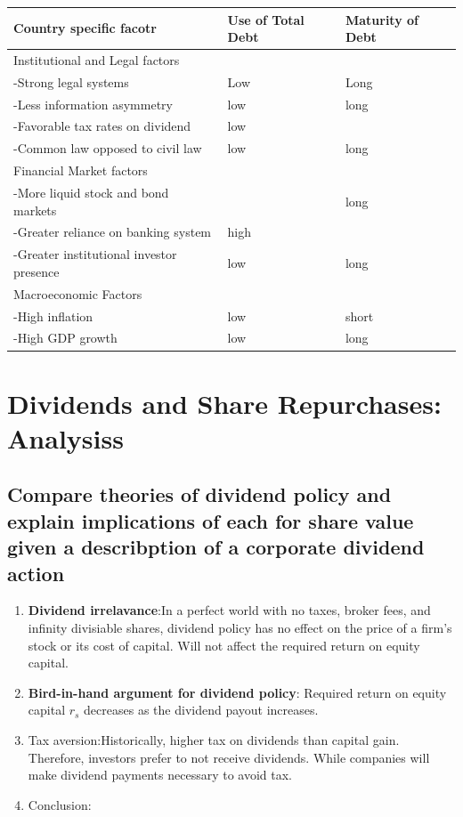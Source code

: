 \documentclass{article}
\newcommand{\be}{\begin{enumerate}}
\newcommand{\ee}{\end{enumerate}}
\begin{document}
\begin{table}[h]
\centering
\begin{tabular}{lll}
\hline
Country specific facotr                 & Use of Total Debt & Maturity of Debt \\ \hline
Institutional and Legal factors        &                   &                  \\
-Strong legal systems                    & Low               & Long             \\
-Less information asymmetry              & low               & long             \\
-Favorable tax rates on dividend         & low               &                  \\
-Common law opposed to civil law         & low               & long             \\
Financial Market factors                &                   &                  \\
-More liquid stock and bond markets      &                   & long             \\
-Greater reliance on banking system      & high              &                  \\
-Greater institutional investor presence & low               & long             \\
Macroeconomic Factors                   &                   &                  \\
-High inflation                          & low               & short            \\
-High GDP growth                         & low               & long             \\ \hline
\end{tabular}
\end{table}



\section{Dividends and Share Repurchases: Analysiss}
\subsection{Compare theories of dividend policy and explain implications of each for share
value given a describption of a corporate dividend action}
\be
    \item {\bf Dividend irrelavance}:In a perfect world with no taxes, broker fees, and infinity
        divisiable shares, dividend policy has no effect on the price of a firm's
        stock or its cost of capital. Will not affect the required return on equity capital.
    \item {\bf Bird-in-hand argument for dividend policy}: Required return on equity capital
        $r_s$ decreases as the dividend payout increases.
    \item Tax aversion:Historically, higher tax on dividends than capital gain. Therefore, investors
        prefer to not receive dividends. While companies will make dividend payments necessary
        to avoid tax.
    \item Conclusion: 
\ee
\end{document}
